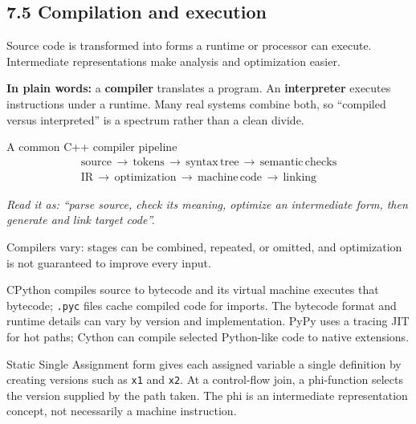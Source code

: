 \documentclass[11pt]{article}
\begin{document}
\begin{keepsection}
\section{7.5 Compilation and execution}

Source code is transformed into forms a runtime or processor can execute. Intermediate representations make analysis and optimization easier.

\begin{plainbox}\textbf{In plain words:} a \textbf{compiler} translates a program. An \textbf{interpreter} executes instructions under a runtime. Many real systems combine both, so “compiled versus interpreted” is a spectrum rather than a clean divide.\end{plainbox}

\begin{equationcard}{A common C++ compiler pipeline}
\[ \begin{gathered} \text{source}\, \to \, \text{tokens}\, \to \, \text{syntax}\, \text{tree}\, \to \, \text{semantic}\, \text{checks} \\ \text{IR}\, \to \, \text{optimization}\, \to \, \text{machine}\, \text{code}\, \to \, \text{linking} \end{gathered} \]
{\small \emph{Read it as: “parse source, check its meaning, optimize an intermediate form, then generate and link target code”.}\par Compilers vary: stages can be combined, repeated, or omitted, and optimization is not guaranteed to improve every input.}
\end{equationcard}

CPython compiles source to bytecode and its virtual machine executes that bytecode; \texttt{.pyc} files cache compiled code for imports. The bytecode format and runtime details can vary by version and implementation. PyPy uses a tracing JIT for hot paths; Cython can compile selected Python-like code to native extensions.

Static Single Assignment form gives each assigned variable a single definition by creating versions such as \texttt{x1} and \texttt{x2}. At a control-flow join, a phi-function selects the version supplied by the path taken. The phi is an intermediate representation concept, not necessarily a machine instruction.


\end{keepsection}
\end{document}
